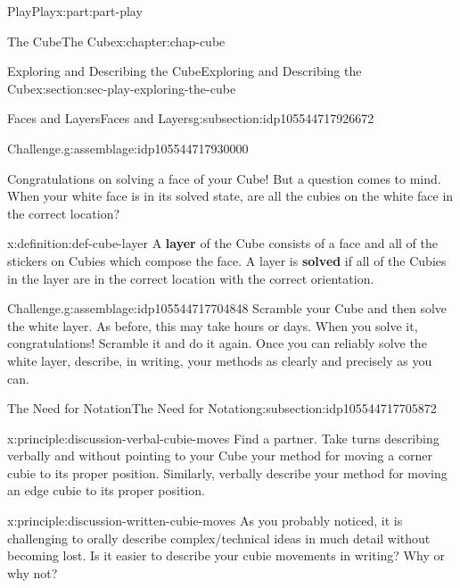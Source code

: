 \documentclass[oneside,10pt,]{book}
\newcommand{\terminology}[1]{\textbf{#1}}
\numberwithin{equation}{section}
\begin{document}
\begin{partptx}{Play}{}{Play}{}{}{x:part:part-play}
\begin{chapterptx}{The Cube}{}{The Cube}{}{}{x:chapter:chap-cube}
\begin{sectionptx}{Exploring and Describing the Cube}{}{Exploring and Describing the Cube}{}{}{x:section:sec-play-exploring-the-cube}
\begin{subsectionptx}{Faces and Layers}{}{Faces and Layers}{}{}{g:subsection:idp105544717926672}
\begin{assemblage}{Challenge.}{g:assemblage:idp105544717930000}
\end{assemblage}
Congratulations on solving a face of your Cube! But a question comes to mind. When your white face is in its solved state, are all the cubies on the white face in the correct location?%
\begin{definition}{}{x:definition:def-cube-layer}%
%
A \terminology{layer} of the Cube consists of a face and all of the stickers on Cubies which compose the face. A layer is \terminology{solved} if all of the Cubies in the layer are in the correct location with the correct orientation.%
\end{definition}
\begin{assemblage}{Challenge.}{g:assemblage:idp105544717704848}%
Scramble your Cube and then solve the white layer. As before, this may take hours or days. When you solve it, congratulations! Scramble it and do it again. Once you can reliably solve the white layer, describe, in writing, your methods as clearly and precisely as you can.%
\end{assemblage}
\end{subsectionptx}
%
%
\typeout{************************************************}
\typeout{************************************************}
%
\begin{subsectionptx}{The Need for Notation}{}{The Need for Notation}{}{}{g:subsection:idp105544717705872}
\begin{principle}{}{}{x:principle:discussion-verbal-cubie-moves}%
Find a partner. Take turns describing verbally and without pointing to your Cube your method for moving a corner cubie to its proper position. Similarly, verbally describe your method for moving an edge cubie to its proper position.%
\end{principle}
\begin{principle}{}{}{x:principle:discussion-written-cubie-moves}%
As you probably noticed, it is challenging to orally describe complex\slash{}technical ideas in much detail without becoming lost. Is it easier to describe your cubie movements in writing? Why or why not?%
\end{principle}

\end{subsectionptx}
\end{sectionptx}
\end{chapterptx}
\end{partptx}
\end{document}
